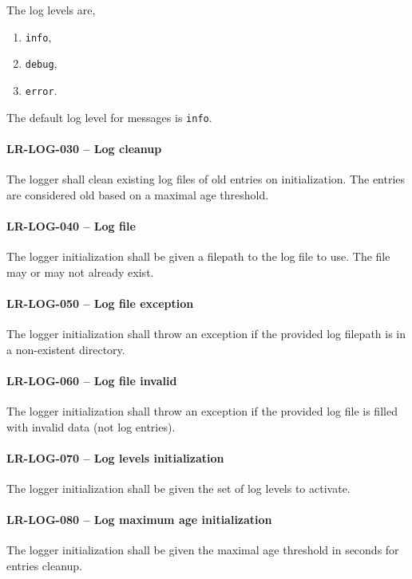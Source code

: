 The log levels are,
\begin{enumerate}
\item \lstinline{info},
\item \lstinline{debug},
\item \lstinline{error}.
\end{enumerate}

The default log level for messages is \lstinline{info}.

\paragraph{LR-LOG-030 -- Log cleanup}
The logger shall clean existing log files of old entries on initialization.
The entries are considered old based on a maximal age threshold.

\paragraph{LR-LOG-040 -- Log file}
The logger initialization shall be given a filepath to the log file
to use. The file may or may not already exist.

\paragraph{LR-LOG-050 -- Log file exception}
The logger initialization shall throw an exception if the provided
log filepath is in a non-existent directory.

\paragraph{LR-LOG-060 -- Log file invalid}
The logger initialization shall throw an exception if the provided
log file is filled with invalid data (not log entries).

\paragraph{LR-LOG-070 -- Log levels initialization}
The logger initialization shall be given the set of log levels
to activate.

\paragraph{LR-LOG-080 -- Log maximum age initialization}
The logger initialization shall be given the maximal age threshold
in seconds for entries cleanup.

